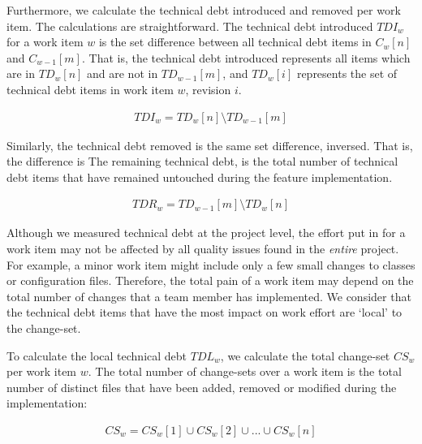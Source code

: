 \documentclass{mpaper}
\begin{document}
Furthermore, we calculate the technical debt introduced and removed per work
item. The calculations are straightforward. The technical debt introduced
$TDI_{w}$ for a work item $w$ is the set difference between all technical debt
items in $C_{w}[n]$ and $C_{w-1}[m]$. That is, the technical debt introduced
represents all items which are in $TD_{w}[n]$ and are not in $TD_{w-1}[m]$, and
$TD_{w}[i]$ represents the set of technical debt items in work item $w$,
revision $i$.

\begin{equation}
  \label{eq-td-introduced}
  \begin{aligned}
    TDI_{w} = TD_{w}[n]  \setminus TD_{w-1}[m]
  \end{aligned}
\end{equation}

Similarly, the technical debt removed is the same set difference, inversed. That
is, the difference is  The remaining technical debt, is the total number of
technical debt items that have remained untouched during the feature
implementation.

\begin{equation}
	\label{eq-td-introduced}
	\begin{aligned}
		TDR_{w} = TD_{w-1}[m]  \setminus TD_{w}[n]
	\end{aligned}
\end{equation}

Although we measured technical debt at the project level, the effort put in for
a work item may not be affected by all quality issues found in the \emph{entire}
project. For example, a minor work item might include only a few small changes
to classes or configuration files. Therefore, the total pain of a work item may
depend on the total number of changes that a team member has implemented. We
consider that the technical debt items that have the most impact on work effort
are `local' to the change-set.

To calculate the local technical debt $TDL_{w}$, we calculate the total
change-set $CS_{w}$ per work item $w$. The total number of change-sets over a
work item is the total number of distinct files that have been added, removed or
modified during the implementation:

\begin{equation}
  \label{eq-td-changes}
  \begin{aligned}
    CS_{w} = CS_{w}[1] \cup CS_{w}[2] \cup ... \cup CS_{w}[n]
  \end{aligned}
\end{equation}
\end{document}
